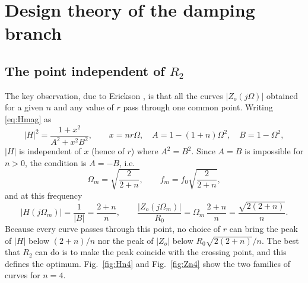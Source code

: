 \documentclass[11pt,a4paper]{article}
\begin{document}
\section{Design theory of the damping branch}
\label{sec:theory}

\subsection{The point independent of \texorpdfstring{$R_2$}{R2}}

The key observation, due to Erickson \cite{Erickson1999}, is that all the curves
$|Z_o(j\Omega)|$ obtained for a given $n$ and any value of $r$ pass through one common
point. Writing \eqref{eq:Hmag} as
\begin{equation}
|H|^2 = \frac{1 + x^2}{A^2 + x^2 B^2}, \qquad
x = n r \Omega, \quad A = 1 - (1+n)\Omega^2, \quad B = 1 - \Omega^2,
\end{equation}
$|H|$ is independent of $x$ (hence of $r$) where $A^2 = B^2$. Since $A = B$ is impossible
for $n > 0$, the condition is $A = -B$, i.e.
\begin{equation}
\Omega_m = \sqrt{\frac{2}{2+n}}, \qquad f_m = f_0 \sqrt{\frac{2}{2+n}},
\label{eq:Om}
\end{equation}
and at this frequency
\begin{equation}
|H(j\Omega_m)| = \frac{1}{|B|} = \frac{2+n}{n}, \qquad
\frac{|Z_o(j\Omega_m)|}{R_0} = \Omega_m\,\frac{2+n}{n} = \frac{\sqrt{2(2+n)}}{n}.
\label{eq:crossing}
\end{equation}
Because every curve passes through this point, no choice of $r$ can bring the peak of
$|H|$ below $(2+n)/n$ nor the peak of $|Z_o|$ below $R_0\sqrt{2(2+n)}/n$. The best that
$R_2$ can do is to make the peak coincide with the crossing point, and this defines the
optimum. Fig.~\ref{fig:Hn4} and Fig.~\ref{fig:Zn4} show the two families of curves for
$n = 4$.
\end{document}
